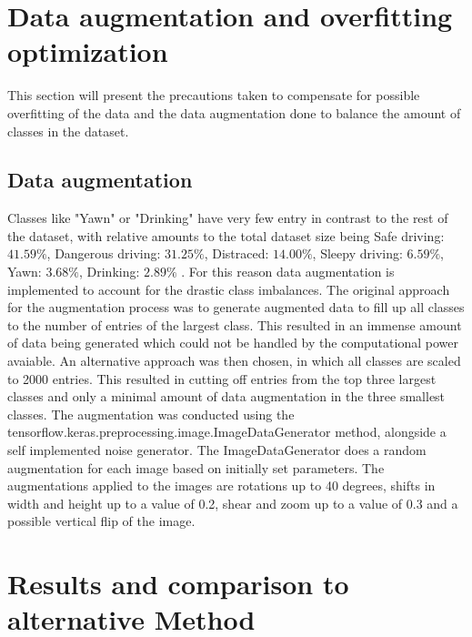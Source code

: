 \section{Data augmentation and overfitting optimization}
    \label{sec:2}
This section will present the precautions taken to compensate for possible overfitting of the data and the data augmentation done to balance the amount of classes in the dataset.
\subsection{Data augmentation}
Classes like "Yawn" or "Drinking" have very few entry in contrast to the rest of the dataset, with relative amounts to the total dataset size being 
Safe driving: $41.59\%$,
Dangerous driving: $31.25\%$,
Distraced: $14.00\%$,
Sleepy driving: $6.59\%$,
Yawn: $3.68\%$,
Drinking: $2.89\%$ .
For this reason data augmentation is implemented to account for the drastic class imbalances.
The original approach for the augmentation process was to generate augmented data to fill up all classes to the number of entries of the largest class. This resulted in an immense amount of data being generated which could not be handled by the computational power avaiable. An alternative approach was then chosen, in which all classes are scaled to 2000 entries. This resulted in cutting off entries from the top three largest classes and only a minimal amount of data augmentation in the three smallest classes. 
The augmentation was conducted using the tensorflow.keras.preprocessing.image.ImageDataGenerator method, alongside a self implemented noise generator. The ImageDataGenerator does a random augmentation for each image based on initially set parameters. The augmentations applied to the images are rotations up to 40 degrees, shifts in width and height up to a value of 0.2, shear and zoom up to a value of 0.3 and a possible vertical flip of the image. 
\section{Results and comparison to alternative Method}
    \label{sec:3}